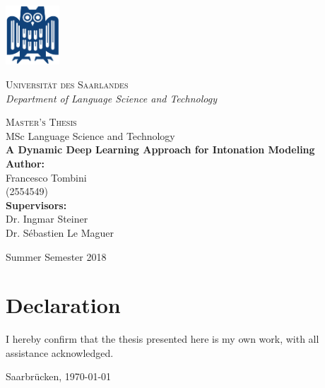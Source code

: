 \begin{titlepage}
	\centering
	
    \includegraphics[width=0.15\textwidth]{figures/saar-uni-logo.pdf}\\
    \vspace{0.5cm}
	
    \textsc{\Large Universit{\"a}t des Saarlandes}\\[0.1cm]
    {\large \textit{Department of Language Science and Technology}}\\
	\vspace{2.5cm}
	
    \textsc{\large Master's Thesis}\\[0.1cm]
    {\large MSc Language Science and Technology}\\[0.5cm]

	{\huge\bfseries A Dynamic Deep Learning Approach for Intonation Modeling}\\[3cm]

    {\large \textbf{Author:}}\\
    {\large Francesco Tombini}\\
    {\large (2554549)}\\[0.5cm]


    {\large \textbf{Supervisors:}}\\
    {\large Dr. Ingmar Steiner}\\
    {\large Dr. S{\'e}bastien Le Maguer}


	\vfill
	\normalsize
	Summer Semester 2018\par

\end{titlepage}

\cleardoublepage

\newpage

\vspace{1.5cm}

\section*{Declaration}


I hereby confirm that the thesis presented here is my own work, with all assistance acknowledged.\par
\vspace{1cm}
Saarbr{\"u}cken, \today \hspace{1cm}\underline{\hspace{5.5cm}}

